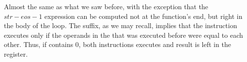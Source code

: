 \mysubparagraph{\OptimizingKeilVI (\ARMMode)}




Almost the same as what we saw before, with the exception that the $str - eos - 1$ 
expression can be computed not at the function's end, but right in the body of the loop.
The  suffix, as we may recall, implies that the instruction executes only if the operands in
the \CMP that was executed before were equal to each other.
Thus, if  contains 0, both  instructions executes and result is left in the  register.

